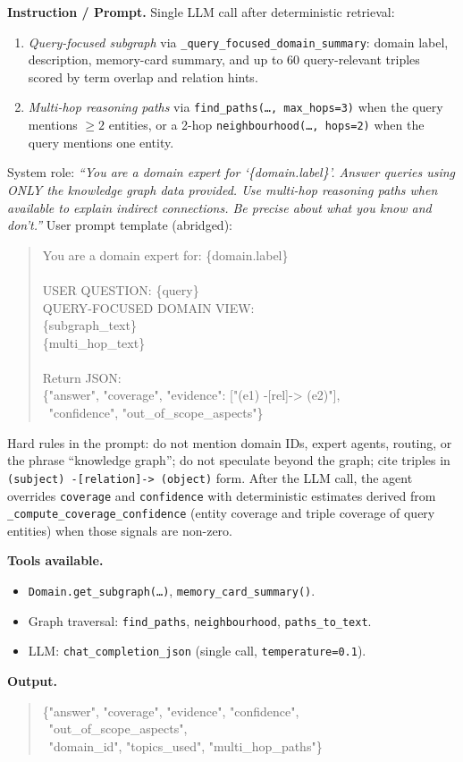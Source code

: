 \documentclass{article}
\begin{document}
\begin{agentbox}
\textbf{Instruction / Prompt.} Single LLM call after deterministic retrieval:
\begin{enumerate}[leftmargin=*,nosep]
\item \emph{Query-focused subgraph} via \texttt{\_query\_focused\_domain\_summary}: domain label, description, memory-card summary, and up to 60 query-relevant triples scored by term overlap and relation hints.
\item \emph{Multi-hop reasoning paths} via \texttt{find\_paths(\ldots, max\_hops=3)} when the query mentions $\ge 2$ entities, or a 2-hop \texttt{neighbourhood(\ldots, hops=2)} when the query mentions one entity.
\end{enumerate}
System role: \textit{``You are a domain expert for `\{domain.label\}'.
Answer queries using ONLY the knowledge graph data provided. Use
multi-hop reasoning paths when available to explain indirect
connections. Be precise about what you know and don't.''}
User prompt template (abridged):
\begin{quote}\footnotesize\ttfamily
You are a domain expert for: \{domain.label\}\\
\\
USER QUESTION: \{query\}\\
QUERY-FOCUSED DOMAIN VIEW:\\
\{subgraph\_text\}\\
\{multi\_hop\_text\}\\
\\
Return JSON:\\
\{"answer", "coverage", "evidence": ["(e1) -[rel]-> (e2)"],\\
\ "confidence", "out\_of\_scope\_aspects"\}
\end{quote}
Hard rules in the prompt: do not mention domain IDs, expert agents,
routing, or the phrase ``knowledge graph''; do not speculate beyond
the graph; cite triples in \texttt{(subject) -[relation]-> (object)}
form. After the LLM call, the agent overrides \texttt{coverage} and
\texttt{confidence} with deterministic estimates derived from
\texttt{\_compute\_coverage\_confidence} (entity coverage and triple
coverage of query entities) when those signals are non-zero.

\textbf{Tools available.}
\begin{itemize}[leftmargin=*,nosep]
\item \texttt{Domain.get\_subgraph(\ldots)}, \texttt{memory\_card\_summary()}.
\item Graph traversal: \texttt{find\_paths}, \texttt{neighbourhood}, \texttt{paths\_to\_text}.
\item LLM: \texttt{chat\_completion\_json} (single call, \texttt{temperature=0.1}).
\end{itemize}

\textbf{Output.}
\begin{quote}\footnotesize\ttfamily
\{"answer", "coverage", "evidence", "confidence",\\
\ "out\_of\_scope\_aspects",\\
\ "domain\_id", "topics\_used", "multi\_hop\_paths"\}
\end{quote}
\end{agentbox}
\end{document}
